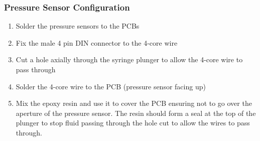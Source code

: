 \subsubsection{Pressure Sensor Configuration}

\begin{enumerate}
    \item Solder the pressure sensors to the PCBs
    \item Fix the male 4 pin DIN connector to the 4-core wire
    \item Cut a hole axially through the syringe plunger to allow the 4-core wire to pass through
    \item Solder the 4-core wire to the PCB (pressure sensor facing up)
    \item Mix the epoxy resin and use it to cover the PCB ensuring not to go over the aperture of the pressure sensor. The resin should form a seal at the top of the plunger to stop fluid passing through the hole cut to allow the wires to pass through.
  \end{enumerate}